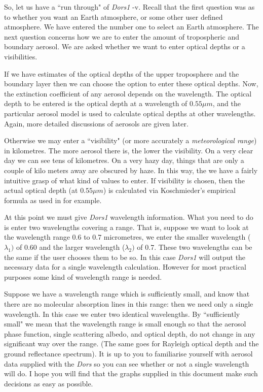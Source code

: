 \documentclass[12pt]{article}
\begin{document}
So, let us have a ``run through" of {\it Dors1} -v. Recall that the  first question was as to
whether you want an Earth
atmosphere, or some other user defined atmosphere. We have entered the number one to select
an Earth atmosphere. The next question concerns how we are to enter the amount of tropospheric
and boundary aerosol. We are asked whether we want to enter optical depths or a visibilities.

If we have estimates of the optical depths of the upper
troposphere and the boundary layer then we can choose the option to enter these optical depths. Now, the extinction coefficient of any aerosol depends on the wavelength. The optical depth to be entered is the optical depth at a wavelength
of $0.55\mu m$, and the particular aerosol model is used to calculate optical depths at other wavelengths. Again, more detailed discussions of aerosols are given later.


Otherwise we may enter a ``visibility" (or more accurately a {\it meteorological range}) in kilometres.
The more aerosol there is, the lower the visibility. On a very clear day we can see tens of kilometres.
 On a very hazy day, things that are only a couple of kilo meters away are obscured by haze. In
this way, the we have a fairly intuitive grasp of what kind of values to enter. If visibility
is chosen, then the actual optical depth (at $0.55 \mu m$)
 is calculated via Koschmieder's empirical formula
 as used in \cite{Longtin_etal:Mybib} for example.

At this point we must give {\it Dors1} wavelength information. What you need to do is enter
two  wavelengths covering a range. That is, suppose we want to look at the wavelength
range 0.6 to 0.7 micrometres, we enter the smaller wavelength ($\lambda_1)$ of 0.60 and the larger
wavelength ($\lambda_2)$ of 0.7. These two wavelengths can be the same if the user chooses them to be so.
In this case  {\it Dors1} will output the necessary data for a single wavelength calculation.
 However for most
practical purposes some kind of wavelength range is needed. 

Suppose we have a  wavelength range which is sufficiently small, and know that 
 there are no  molecular absorption lines in this range: then we need only a single wavelength. 
In this case we enter two identical wavelengths. By ``sufficiently small" we mean that the wavelength range is
small enough so that the aerosol phase function, single scattering albedo, and optical depth,
 do not change in any significant way over the range. (The same goes for Rayleigh optical depth and the ground
reflectance spectrum). It is
up to you to familiarise yourself with aerosol data supplied with the {\it Dors} so you can see
whether or not a single wavelength will do. I hope you will find
that the graphs supplied in this document make such decisions as easy as possible.
\end{document}
